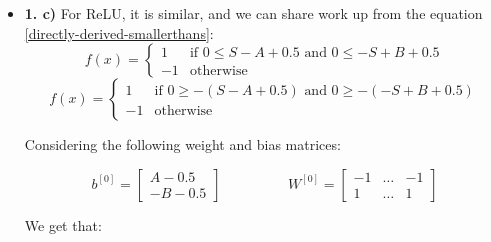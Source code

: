 \documentclass[12pt]{article}
\begin{document}
\begin{itemize}
    \item \textbf{1. c)} For ReLU, it is similar, and we can share work up from the equation \ref{directly-derived-smallerthans}:
        \[
            f(x) =
            \begin{cases}
                1 & \text{if } 0 \leq S -A+0.5 \text{ and } 0 \leq -S+B+0.5 \\
                -1 & \text{otherwise}
            \end{cases}
        \]
        \begin{equation}
            f(x) =
            \begin{cases}
                1 & \text{if } 0 \geq -(S-A+0.5) \text{ and } 0 \geq -(-S+B+0.5) \\
                -1 & \text{otherwise}
            \end{cases}
            \label{directly-derived-greaterthans}
\end{equation}



        Considering the following weight and bias matrices:

        \[
            b^{[0]} = \begin{bmatrix}
                A-0.5 \\
                -B-0.5
            \end{bmatrix}
            \hspace{2cm}
            W^{[0]} = \begin{bmatrix}
                -1 & \hdots & -1 \\
                1 & \hdots & 1
            \end{bmatrix}
        \]

        We get that:


\end{itemize}
\end{document}
